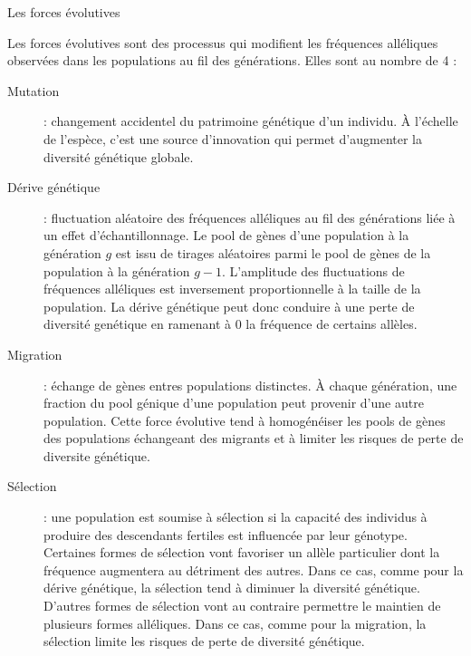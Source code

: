 \documentclass[a4paper,12pt,twoside]{article}\usepackage[]{graphicx}\usepackage[]{color}
\begin{document}
\begin{enca}
\caption{Les forces évolutives}\label{Forces}
\onehalfspacing
	Les forces évolutives sont des processus qui modifient les fréquences alléliques observées dans les populations au fil des générations. Elles sont au nombre de 4 :
\begin{description}
	\item[Mutation] : changement accidentel du patrimoine génétique d'un individu. À l'échelle de l'espèce, c'est une source d'innovation qui permet d'augmenter la diversité génétique globale.
	\item[Dérive génétique] : fluctuation aléatoire des fréquences alléliques au fil des générations liée à un effet d'échantillonnage. Le pool de gènes d'une population à la génération $g$ est issu de tirages aléatoires parmi le pool de gènes de la population à la génération $g-1$. L'amplitude des fluctuations de fréquences alléliques est inversement proportionnelle à la taille de la population. La dérive génétique peut donc conduire à une perte de diversité genétique en ramenant à 0 la fréquence de certains allèles.
	\item[Migration] : échange de gènes entres populations distinctes. À chaque génération, une fraction du pool génique d'une population peut provenir d'une autre population. Cette force évolutive tend à homogénéiser les pools de gènes des populations échangeant des migrants et à limiter les risques de perte de diversite génétique.
	\item[Sélection] : une population est soumise à sélection si la capacité des individus à produire des descendants fertiles est influencée par leur génotype. Certaines formes de sélection vont favoriser un allèle particulier dont la fréquence augmentera au détriment des autres. Dans ce cas, comme pour la dérive génétique, la sélection tend à diminuer la diversité génétique. D'autres formes de sélection vont au contraire permettre le maintien de plusieurs formes alléliques. Dans ce cas, comme pour la migration, la sélection limite les risques de perte de diversité génétique.
\end{description}
\end{enca}
\end{document}
